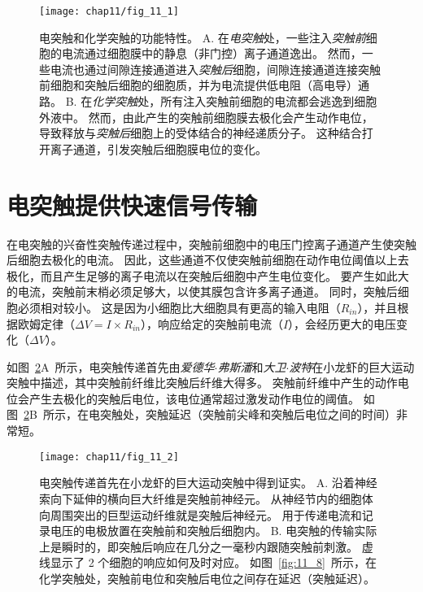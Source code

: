 \begin{figure}[htbp]
	\centering
	\texttt{[image: chap11/fig\_11\_1]}
	\caption{电突触和化学突触的功能特性。
		A. 在\textit{电突触}处，一些注入\textit{突触前}细胞的电流通过细胞膜中的静息（非门控）离子通道逸出。
		然而，一些电流也通过间隙连接通道进入\textit{突触后}细胞，间隙连接通道连接突触前细胞和突触后细胞的细胞质，并为电流提供低电阻（高电导）通路。
		B. 在\textit{化学突触}处，所有注入突触前细胞的电流都会逃逸到细胞外液中。
		然而，由此产生的突触前细胞膜去极化会产生动作电位，导致释放与\textit{突触后}细胞上的受体结合的神经递质分子。
		这种结合打开离子通道，引发突触后细胞膜电位的变化。}
	\label{fig:11_1}
\end{figure}


\section{电突触提供快速信号传输}

在电突触的兴奋性突触传递过程中，突触前细胞中的电压门控离子通道产生使突触后细胞去极化的电流。
因此，这些通道不仅使突触前细胞在动作电位阈值以上去极化，而且产生足够的离子电流以在突触后细胞中产生电位变化。
要产生如此大的电流，突触前末梢必须足够大，以使其膜包含许多离子通道。
同时，突触后细胞必须相对较小。
这是因为小细胞比大细胞具有更高的输入电阻（$R_{in}$），并且根据欧姆定律（$\Delta V = I \times R_{in}$），响应给定的突触前电流（$I$），会经历更大的电压变化（$\Delta V$）。


如图~\ref{fig:11_2}A~所示，电突触传递首先由\textit{爱德华$\cdot$弗斯潘}和\textit{大卫$\cdot$波特}在小龙虾的巨大运动突触中描述，其中突触前纤维比突触后纤维大得多。
突触前纤维中产生的动作电位会产生去极化的突触后电位，该电位通常超过激发动作电位的阈值。
如图~\ref{fig:11_2}B~所示，在电突触处，突触延迟（突触前尖峰和突触后电位之间的时间）非常短。


\begin{figure}[htbp]
	\centering
	\texttt{[image: chap11/fig\_11\_2]}
	\caption{电突触传递首先在小龙虾的巨大运动突触中得到证实\cite{furshpan1959transmission,furshpan1957mechanism}。 
		A. 沿着神经索向下延伸的横向巨大纤维是突触前神经元。
		从神经节内的细胞体向周围突出的巨型运动纤维就是突触后神经元。
		用于传递电流和记录电压的电极放置在突触前和突触后细胞内。
		B. 电突触的传输实际上是瞬时的，即突触后响应在几分之一毫秒内跟随突触前刺激。
		虚线显示了 2 个细胞的响应如何及时对应。
		如图~\ref{fig:11_8}~所示，在化学突触处，突触前电位和突触后电位之间存在延迟（突触延迟）。}
	\label{fig:11_2}
\end{figure}


